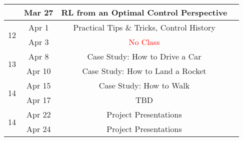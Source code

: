 \documentclass[11pt,letterpaper]{article}
\begin{document}
\begin{tabular}{c|c|c|c}
	 & Mar 27 & RL from an Optimal Control Perspective &   \\
	 \hline
	\multirow{2}{*}{12}  & Apr 1 & Practical Tips \& Tricks, Control History 
         &   \\
	 & Apr 3 & \textcolor{red}{No Class} &   \\
	 \hline
	\multirow{2}{*}{13}  & Apr 8 & Case Study: How to Drive a Car
         &  \\
	 & Apr 10 & Case Study: How to Land a Rocket &   \\
	 \hline
	\multirow{2}{*}{14}  & Apr 15 & Case Study: How to Walk
         &  \\
	 & Apr 17 &  TBD &   \\
	 \hline
	\multirow{2}{*}{14}  & Apr 22 &
        Project Presentations &  \\
	 & Apr 24 & Project Presentations &   \\
\end{tabular}
\end{document}
